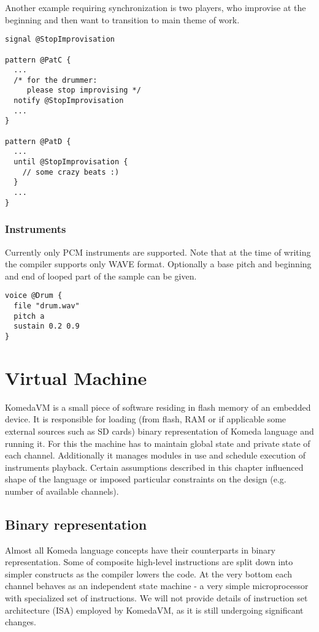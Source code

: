 \documentclass{article}
\begin{document}
Another example requiring synchronization is two players, who improvise at the
beginning and then want to transition to main theme of work.

\begin{lstlisting}[caption=Communication through signalling]
signal @StopImprovisation

pattern @PatC {
  ...
  /* for the drummer:
     please stop improvising */
  notify @StopImprovisation
  ...
}

pattern @PatD {
  ...
  until @StopImprovisation {
    // some crazy beats :)
  }
  ...
}
\end{lstlisting}

\subsubsection{Instruments}

Currently only PCM instruments are supported. Note that at the time of writing
the compiler supports only WAVE format. Optionally a base pitch and beginning
and end of looped part of the sample can be given.

\begin{lstlisting}[caption=Example voice definition]
voice @Drum {
  file "drum.wav"
  pitch a
  sustain 0.2 0.9
}
\end{lstlisting}

\section{Virtual Machine}

KomedaVM is a small piece of software residing in flash memory of an embedded
device. It is responsible for loading (from flash, RAM or if applicable some
external sources such as SD cards) binary representation of Komeda language and
running it. For this the machine has to maintain global state and private state
of each channel. Additionally it manages modules in use and schedule execution
of instruments playback. Certain assumptions described in this chapter
influenced shape of the language or imposed particular constraints on the
design (e.g. number of available channels).  

\subsection{Binary representation}

Almost all Komeda language concepts have their counterparts in binary
representation. Some of composite high-level instructions are split down into
simpler constructs as the compiler lowers the code. At the very bottom each
channel behaves as an independent state machine - a very simple microprocessor
with specialized set of instructions. We will not provide details of
instruction set architecture (ISA) employed by KomedaVM, as it is still
undergoing significant changes.
\end{document}
